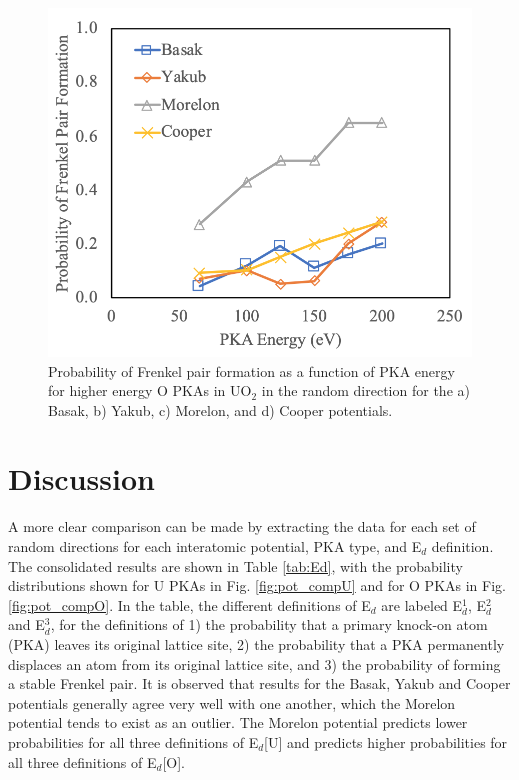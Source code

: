 \documentclass[review]{elsarticle}
\begin{document}
\begin{figure}[h]
 \centering
 \includegraphics[width=1.0\textwidth]{FP_OE.png}
 \caption{Probability of Frenkel pair formation as a function of PKA energy for higher energy O PKAs in UO$_2$ in the random direction for the a) Basak, b) Yakub, c) Morelon, and d) Cooper potentials.}
 \label{fig:fpoe}
\end{figure}

\FloatBarrier

\section{Discussion}

A more clear comparison can be made by extracting the data for each set of random directions for each interatomic potential, PKA type, and E$_d$ definition. The consolidated results are shown in Table \ref{tab:Ed}, with the probability distributions shown for U PKAs in Fig. \ref{fig:pot_compU} and for O PKAs in Fig. \ref{fig:pot_compO}. In the table, the different definitions of E$_d$ are labeled E$_d^1$, E$_d^2$ and E$_d^3$, for the definitions of 1) the probability that a primary knock-on atom (PKA) leaves its original lattice site, 2) the probability that a PKA permanently displaces an atom from its original lattice site, and 3) the probability of forming a stable Frenkel pair. It is observed that results for the Basak, Yakub and Cooper potentials generally agree very well with one another, which the Morelon potential tends to exist as an outlier. The Morelon potential predicts lower probabilities for all three definitions of E$_d$[U] and predicts higher probabilities for all three definitions  of E$_d$[O].
\end{document}
